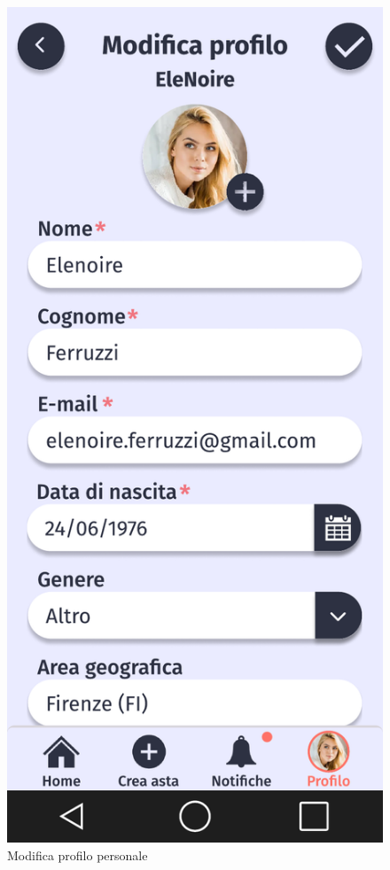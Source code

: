     \begin{figure}[!htb]
        \begin{minipage}{0.32\textwidth}
            \centering
            \includegraphics[width=.7\linewidth]{Immagini/Frames/Compratore/C12.pdf}
            \caption{Modifica profilo personale}
        \end{minipage}\hfill
        \begin{minipage}{0.32\textwidth}
            \centering

\end{minipage}
\end{figure}
